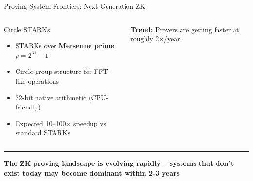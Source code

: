 \documentclass[8pt,aspectratio=169]{beamer}
\newcommand{\bottomnote}[1]{\vfill\vspace{-2mm}\textcolor{mllavender2}{\rule{\textwidth}{0.4pt}}\vspace{1mm}\footnotesize\textbf{#1}}
\begin{document}
\begin{frame}{Proving System Frontiers: Next-Generation ZK}
\begin{columns}[T]
\begin{block}{\footnotesize Circle STARKs}
\begin{itemize}
\item STARKs over \textbf{Mersenne prime} $p = 2^{31} - 1$
\item Circle group structure for FFT-like operations
\item 32-bit native arithmetic (CPU-friendly)
\item Expected 10--100$\times$ speedup vs standard STARKs
\end{itemize}
\end{block}
\vspace{0.1cm}
\footnotesize
\textbf{Trend:} Provers are getting faster at roughly 2$\times$/year.
\end{columns}
\bottomnote{The ZK proving landscape is evolving rapidly -- systems that don't exist today may become dominant within 2-3 years}
\end{frame}
\end{document}
